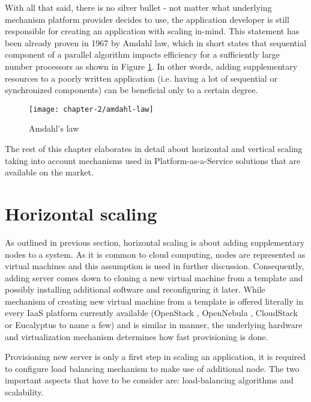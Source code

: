 With all that said, there is no silver bullet - not matter what underlying mechanism platform provider decides to use, the application developer is still responsible for creating an application with scaling in-mind. This statement has been already proven in 1967 by Amdahl law, which in short states that sequential component of a parallel algorithm impacts efficiency for a sufficiently large number processors \cite{Am67} as shown in Figure \ref{ch2:amdahl-law}. In other words, adding supplementary resources to a poorly written application (i.e. having a lot of sequential or synchronized components) can be beneficial only to a certain degree. 

\begin{figure}[!ht]
  \begin{center}
    \texttt{[image: chapter-2/amdahl-law]}
  \end{center}
  \caption{Amdahl's law}
  \label{ch2:amdahl-law}
\end{figure}



The rest of this chapter elaborates in detail about horizontal and vertical scaling taking into account mechanisms used in Platform-as-a-Service solutions that are available on the market.

\section{Horizontal scaling}
As outlined in previous section, horizontal scaling is about adding supplementary nodes to a system. As it is common to cloud computing, nodes are represented as virtual machines and this assumption is used in further discussion. Consequently, adding server comes down to cloning a new virtual machine from a template and possibly installing additional software and reconfiguring it later. While mechanism of creating new virtual machine from a template is offered literally in every IaaS platform currently available (OpenStack \cite{OpenStack}, OpenNebula \cite{OpenNebula}, CloudStack \cite{CloudStack} or Eucalyptus \cite{Eucalyptus} to name a few) and is similar in manner, the underlying hardware and virtualization mechanism determines how fast provisioning is done. 

Provisioning new server is only a first step in scaling an application, it is required to configure load balancing mechanism to make use of additional node. The two important aspects that have to be consider are: load-balancing algorithms and scalability.

